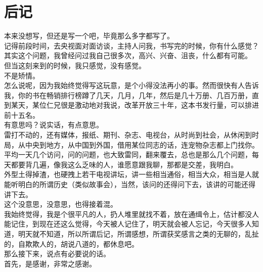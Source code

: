 \chapter*{后记}
\ifnum{}
	\begin{multicols}{\theparacolNo}
\fi
本来没想写，但还是写一个吧，毕竟那么多字都写了。\\

记得前段时间，去央视面对面访谈，主持人问我，书写完的时候，你有什么感觉？\\

其实这个问题，我曾经问过我自己很多次，高兴、兴奋、沮丧，什么都有可能。\\

但当这刻来到的时候，我只感觉，没有感觉。\\

不是矫情。\\

怎么说呢，因为我始终觉得写这玩意，是个小得没法再小的事。然而很快有人告诉我，你的书在畅销排行榜蹲了几天，几月，几年，然后是几十万册、几百万册，直到某天，某位仁兄很是激动地对我说，改革开放三十年，这本书发行量，可以排进前十五名。\\

有意思吗？说实话，有点意思。\\

雷打不动的，还有媒体，报纸、期刊、杂志、电视台，从时尚到社会，从休闲到时局，从中央到地方，从中国到外国，借用某位同志的话，连宠物杂志都上门找你。平均一天几个访问，问的问题，也大致雷同，翻来覆去，总也是那么几个问题，每天都要背几遍，像我这么乏味的人，谁愿意跟我聊，那都是交差，我明白。\\

外型土得掉渣，也硬拽上若干电视讲坛，讲一些相当通俗，相当大众，相当是人就能听明白的所谓历史（类似故事会），当然，该问的还得问下去，该讲的可能还得讲下去。\\

这个没意思，没意思，也得接着混。\\

我始终觉得，我是个很平凡的人，扔人堆里就找不着，放在通缉令上，估计都没人能记住，到现在还这么觉得，今天被人记住了，明天就会被人忘记，今天很多人知道，明天就不知道，所以所谓后记，所谓感想，所谓获奖感言之类的无聊的，乱扯的，自欺欺人的，胡说八道的，都休息吧。\\

那么接下来，说点有必要说的话。\\

首先，是感谢，非常之感谢。\\


\end{multicols}
